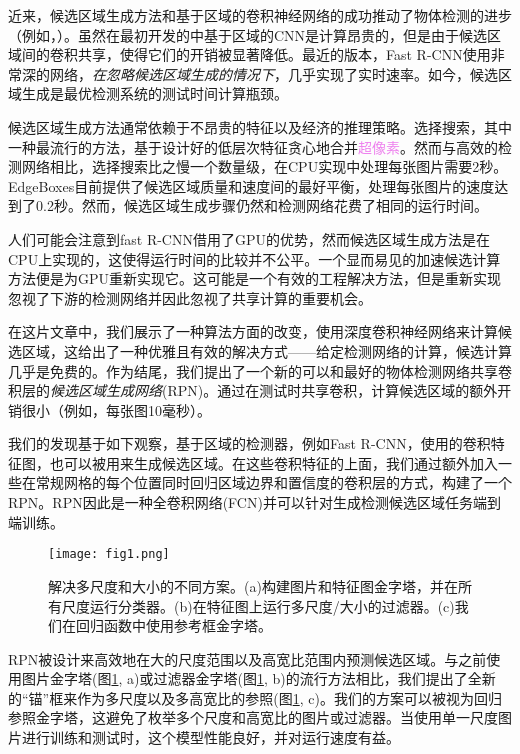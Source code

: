 \documentclass[../main]{subfile}
\begin{document}
近来，候选区域生成方法和基于区域的卷积神经网络的成功推动了物体检测的进步（例如，\cite{selectiveSearch}）。虽然在最初开发的\cite{rcnn}中基于区域的CNN是计算昂贵的，但是由于候选区域间的卷积共享，使得它们的开销被显著降低。最近的版本，Fast R-CNN\cite{fastrcnn}使用非常深的网络，\textit{在忽略候选区域生成的情况下}，几乎实现了实时速率。如今，候选区域生成是最优检测系统的测试时间计算瓶颈。

候选区域生成方法通常依赖于不昂贵的特征以及经济的推理策略。选择搜索\cite{selectiveSearch}，其中一种最流行的方法，基于设计好的低层次特征贪心地合并\textcolor{violet}{超像素}。然而与高效的检测网络\cite{fastrcnn}相比，选择搜索比之慢一个数量级，在CPU实现中处理每张图片需要2秒。EdgeBoxes\cite{edgeBoxes}目前提供了候选区域质量和速度间的最好平衡，处理每张图片的速度达到了0.2秒。然而，候选区域生成步骤仍然和检测网络花费了相同的运行时间。

人们可能会注意到fast R-CNN借用了GPU的优势，然而候选区域生成方法是在CPU上实现的，这使得运行时间的比较并不公平。一个显而易见的加速候选计算方法便是为GPU重新实现它。这可能是一个有效的工程解决方法，但是重新实现忽视了下游的检测网络并因此忽视了共享计算的重要机会。

在这片文章中，我们展示了一种算法方面的改变，使用深度卷积神经网络来计算候选区域，这给出了一种优雅且有效的解决方式——给定检测网络的计算，候选计算几乎是免费的。作为结尾，我们提出了一个新的可以和最好的物体检测网络\cite{fastrcnn, rcnn}共享卷积层的\textit{候选区域生成网络}(RPN)。通过在测试时共享卷积，计算候选区域的额外开销很小（例如，每张图10毫秒）。

我们的发现基于如下观察，基于区域的检测器，例如Fast R-CNN，使用的卷积特征图，也可以被用来生成候选区域。在这些卷积特征的上面，我们通过额外加入一些在常规网格的每个位置同时回归区域边界和置信度的卷积层的方式，构建了一个RPN。RPN因此是一种全卷积网络(FCN)\cite{fcn}并可以针对生成检测候选区域任务端到端训练。

\begin{figure}[bh]
    \centering
    \texttt{[image: fig1.png]}
    \caption{解决多尺度和大小的不同方案。(a)构建图片和特征图金字塔，并在所有尺度运行分类器。(b)在特征图上运行多尺度/大小的过滤器。(c)我们在回归函数中使用参考框金字塔。}
    \label{fig:img1}
\end{figure}

RPN被设计来高效地在大的尺度范围以及高宽比范围内预测候选区域。与之前使用图片金字塔(图\ref{fig:img1}, a)或过滤器金字塔(图\ref{fig:img1}, b)的流行方法\cite{overfeat, dpm, rcnn, fastrcnn, }相比，我们提出了全新的“锚”框来作为多尺度以及多高宽比的参照(图\ref{fig:img1}, c)。我们的方案可以被视为回归参照金字塔，这避免了枚举多个尺度和高宽比的图片或过滤器。当使用单一尺度图片进行训练和测试时，这个模型性能良好，并对运行速度有益。
\end{document}
